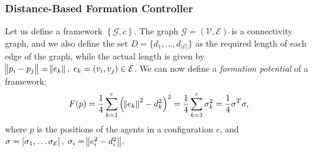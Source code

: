 \documentclass{iacas}
\newtheorem{definition}{Definition}
\begin{document}

\subsubsection{Distance-Based Formation Controller}
Let us define a framework $\left\{\mathcal{G}, c \right\}$. The graph $\mathcal{G} = (\mathcal{V}, \mathcal{E})$ is a connectivity graph, and we also define the set $D = \{d_1, \ldots, d_{|\mathcal{E}|}\}$ as the required length of each edge of the graph, while the actual length is given by $\norm{p_i-p_j}=\norm{e_k},\; e_k =(v_i,v_j) \in \mathcal{E}$. We can now define a \emph{formation potential} of a framework:
\begin{equation}
F(p) = \frac{1}{4}\sum_{k=1}^{\varepsilon}\left( \norm{e_k}^2 - d_{k}^{2} \right)^2 = \frac{1}{4}\sum_{k=1}^{\varepsilon} \sigma_k^2 = \frac{1}{4}\sigma^T \sigma,
\label{eq:formation potential}
\end{equation}
where $p$ is the positions of the agents in a configuration $c$, and $\sigma = \left[\sigma_1, \ldots \sigma_\mathcal{E} \right], \; \sigma_i = \norm{e_i^2 - d_{i}^{2}}$.
\end{document}
